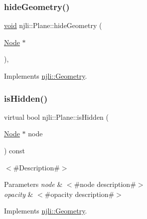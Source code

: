 \subsubsection{\texorpdfstring{hide\+Geometry()}{hideGeometry()}}
{\footnotesize\ttfamily \mbox{\hyperlink{_thread_8h_af1e856da2e658414cb2456cb6f7ebc66}{void}} njli\+::\+Plane\+::hide\+Geometry (\begin{DoxyParamCaption}\item[{\mbox{\hyperlink{classnjli_1_1_node}{Node}} $\ast$}]{ }\end{DoxyParamCaption})\hspace{0.3cm}{\ttfamily [protected]}, {\ttfamily [virtual]}}



Implements \mbox{\hyperlink{classnjli_1_1_geometry_a3780bbd093a4b163de3499e5726667f9}{njli\+::\+Geometry}}.

\mbox{\label{classnjli_1_1_plane_a3c9fb24d02e80c3f2f91790bed222886}} 
\subsubsection{\texorpdfstring{is\+Hidden()}{isHidden()}}
{\footnotesize\ttfamily virtual bool njli\+::\+Plane\+::is\+Hidden (\begin{DoxyParamCaption}\item[{\mbox{\hyperlink{classnjli_1_1_node}{Node}} $\ast$}]{node }\end{DoxyParamCaption}) const\hspace{0.3cm}{\ttfamily [virtual]}}

$<$\#\+Description\#$>$


\begin{DoxyParams}{Parameters}
{\em node} & $<$\#node description\#$>$ \\
\hline
{\em opacity} & $<$\#opacity description\#$>$ \\
\hline
\end{DoxyParams}


Implements \mbox{\hyperlink{classnjli_1_1_geometry_ac1ea8a16d541174a03addfa2dfede406}{njli\+::\+Geometry}}.

\mbox{\label{classnjli_1_1_plane_a0c9b3ff7436f10618116b3392dab9cd4}} 
